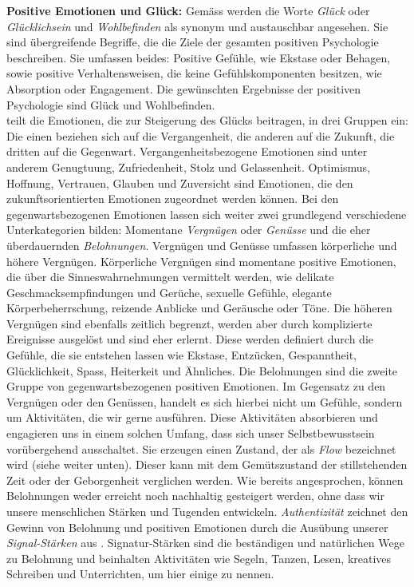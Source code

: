 \par
\textbf{Positive Emotionen und Glück:} 
Gemäss  werden die Worte \textit{Glück} oder \textit{Glücklichsein} und \textit{Wohlbefinden} als synonym und austauschbar angesehen. Sie sind übergreifende Begriffe, die die Ziele der gesamten positiven Psychologie beschreiben. Sie umfassen beides: Positive Gefühle, wie Ekstase oder Behagen, sowie positive Verhaltensweisen, die keine Gefühlskomponenten besitzen, wie Absorption oder Engagement. Die gewünschten Ergebnisse der positiven Psychologie sind Glück und Wohlbefinden.\\
 teilt die Emotionen, die zur Steigerung des Glücks beitragen, in drei Gruppen ein: Die einen beziehen sich auf die Vergangenheit, die anderen auf die Zukunft, die dritten auf die Gegenwart. Vergangenheitsbezogene Emotionen sind unter anderem Genugtuung, Zufriedenheit, Stolz und Gelassenheit. Optimismus, Hoffnung, Vertrauen, Glauben und Zuversicht sind Emotionen, die den zukunftsorientierten Emotionen zugeordnet werden können. Bei den gegenwartsbezogenen Emotionen lassen sich weiter zwei grundlegend verschiedene Unterkategorien bilden: Momentane \textit{Vergnügen} oder \textit{Genüsse} und die eher überdauernden \textit{Belohnungen}. Vergnügen und Genüsse umfassen körperliche und höhere Vergnügen. Körperliche Vergnügen sind momentane positive Emotionen, die über die Sinneswahrnehmungen vermittelt werden, wie delikate Geschmacksempfindungen und Gerüche, sexuelle Gefühle, elegante Körperbeherrschung, reizende Anblicke und Geräusche oder Töne. Die höheren Vergnügen sind ebenfalls zeitlich begrenzt, werden aber durch komplizierte Ereignisse ausgelöst und sind eher erlernt. Diese werden definiert durch die Gefühle, die sie entstehen lassen wie Ekstase, Entzücken, Gespanntheit, Glücklichkeit, Spass, Heiterkeit und Ähnliches. Die Belohnungen sind die zweite Gruppe von gegenwartsbezogenen positiven Emotionen. Im Gegensatz zu den Vergnügen oder den Genüssen, handelt es sich hierbei nicht um Gefühle, sondern um Aktivitäten, die wir gerne ausführen. Diese Aktivitäten absorbieren und engagieren uns in einem solchen Umfang, dass sich unser Selbstbewusstsein vorübergehend ausschaltet. Sie erzeugen einen Zustand, der als \textit{Flow} bezeichnet wird (siehe weiter unten). Dieser kann mit dem Gemütszustand der stillstehenden Zeit oder der Geborgenheit verglichen werden. Wie bereits angesprochen, können Belohnungen weder erreicht noch nachhaltig gesteigert werden, ohne dass wir unsere menschlichen Stärken und Tugenden entwickeln. \textit{Authentizität} zeichnet den Gewinn von Belohnung und positiven Emotionen durch die Ausübung unserer \textit{Signal-Stärken} aus \cite{Seligman2003}. Signatur-Stärken sind die beständigen und natürlichen Wege zu Belohnung und beinhalten Aktivitäten wie Segeln, Tanzen, Lesen, kreatives Schreiben und Unterrichten, um hier einige zu nennen.
